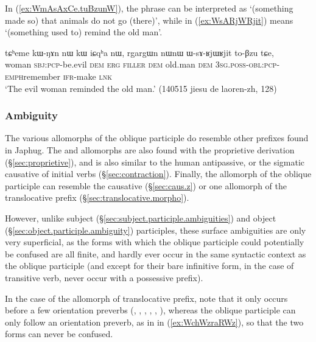 In (\ref{ex:WmAsAxCe.tuBzunW}), the phrase  can be interpreted as `(something made so) that animals do not go (there)', while in (\ref{ex:WsARjWRjit})  means `(something used to) remind the old man'. 

\begin{exe}
\ex \label{ex:WsARjWRjit}
\gll tɕʰeme kɯ-ŋɤn nɯ kɯ iɕqʰa nɯ, rgargɯn nɯnɯ ɯ-sɤ-ʁjɯ\redp{}ʁjit to-βzu tɕe, \\
woman \textsc{sbj}:\textsc{pcp}-be.evil \textsc{dem} \textsc{erg} \textsc{filler} \textsc{dem} old.man \textsc{dem} \textsc{3sg}.\textsc{poss}-\textsc{obl}:\textsc{pcp}-\textsc{emph}\redp{}remember \textsc{ifr}-make \textsc{lnk} \\
\glt `The evil woman reminded the old man.' (140515 jiesu de laoren-zh, 128)
\end{exe}


\subsubsection{Ambiguity} \label{sec:oblique.participle.ambiguity}
The various allomorphs of the oblique participle do resemble other prefixes found in Japhug. The  and  allomorphs are also found with the proprietive derivation (§\ref{sec:proprietive}), and  is also similar to the human antipassive, or the sigmatic causative of  initial verbs (§\ref{sec:contraction}). Finally, the  allomorph of the oblique participle can resemble the causative (§\ref{sec:caus.z}) or one allomorph of the translocative prefix (§\ref{sec:translocative.morpho}).

However, unlike subject (§\ref{sec:subject.participle.ambiguities}) and object (§\ref{sec:object.participle.ambiguity}) participles, these surface ambiguities are only very superficial, as the forms with which the oblique participle could potentially be confused are all finite, and hardly ever occur in the same syntactic context as the oblique participle (and except for their bare infinitive form, in the case of transitive verb, never occur with a possessive prefix). 

In the case of the  allomorph of translocative prefix, note that it only occurs before a few orientation preverbs (, , , , , ), whereas the oblique participle  can only follow an orientation preverb, as in  in (\ref{ex:WchWzraRWz}), so that the two forms can never be confused.

